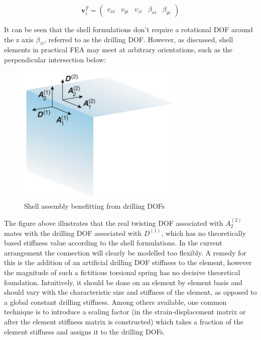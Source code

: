 \begin{equation} 
\mathbf{v}_i^T = \begin{pmatrix}
v_{xi} & v_{yi} & v_{zi} & \beta_{xi} & \beta_{yi}
\end{pmatrix}
\label{eqsdrilling}
\end{equation}

It can be seen that the shell formulations don't require a rotational DOF around the z axis $\beta_{zi}$, referred to as the drilling DOF. However, as discussed, shell elements in practical FEA may meet at arbitrary orientations, such as the perpendicular intersection below:

\begin{figure}[H]
	\centering
	\def\svgwidth{\columnwidth}
	\includegraphics[width=8cm]{images/drillingDOF.png}
	\caption{Shell assembly benefitting from drilling DOFs \cite{BischLitBook04}}
	\label{shellModels}
\end{figure}

The figure above illustrates that the real twisting DOF associated with $A_2^{(2)}$ mates with the drilling DOF associated with $D^{(1)}$, which has no theoretically based stiffness value according to the shell formulations. In the current arrangement the connection will clearly be modelled too flexibly.  A remedy for this is the addition of an artificial drilling DOF stiffness to the element, however the magnitude of such a fictitious torsional spring has no decisive theoretical foundation. Intuitively, it should be done on an element by element basis and should vary with the characteristic size and stiffness of the element, as opposed to a global constant drilling stiffness. Among others available, one common technique is to introduce a scaling factor (in the strain-displacement matrix or after the element stiffness matrix is constructed) which takes a fraction of the element stiffness and assigns it to the drilling DOFs. 

